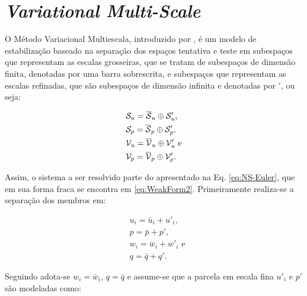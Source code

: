 \section{\textit{Variational Multi-Scale}} \label{VMS}

O Método Variacional Multiescala, introduzido por , é um modelo de estabilização baseado na separação dos espaços tentativa e teste em subespaços que representam as escalas grosseiras, que se tratam de subespaços de dimensão finita, denotadas por uma barra sobrescrita, e subespaços que representam as escalas refinadas, que são subespaços de dimensão infinita e denotadas por $'$, ou seja:

\begin{subequations}
    \begin{align}
         & \mathcal{S}_u=\overline{\mathcal{S}}_u\oplus\mathcal{S}'_u\text{,}  \\
         & \mathcal{S}_p=\overline{\mathcal{S}}_p\oplus\mathcal{S}'_p\text{,}  \\
         & \mathcal{V}_u=\overline{\mathcal{V}}_u\oplus\mathcal{V}'_u\text{ e} \\
         & \mathcal{V}_p=\overline{\mathcal{V}}_p\oplus\mathcal{V}'_p\text{.}
    \end{align}
\end{subequations}

Assim, o sistema a ser resolvido parte do apresentado na Eq. \eqref{eq:NS-Euler}, que em sua forma fraca se encontra em \eqref{eq:WeakForm2}. Primeiramente realiza-se a separação dos membros em:

\begin{subequations}
    \begin{align}
         & u_i=\bar{u}_i+u'_i\text{,}  \\
         & p=\bar{p}+p'\text{,}        \\
         & w_i=\bar{w}_i+w'_i\text{ e} \\
         & q=\bar{q}+q'\text{.}
    \end{align}
\end{subequations}

Seguindo  adota-se $w_i=\bar{w}_i$, $q=\bar{q}$ e assume-se que a parcela em escala fina $u'_i$ e $p'$ são modeladas como:

